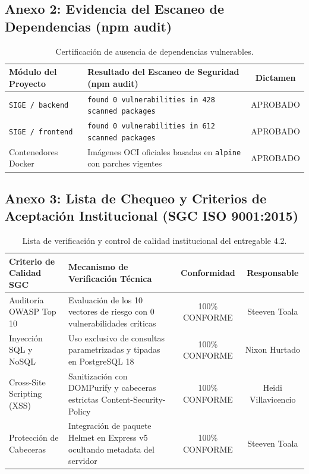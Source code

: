 \documentclass[12pt,a4paper]{article}
\begin{document}
\subsection*{Anexo 2: Evidencia del Escaneo de Dependencias (npm audit)}
\begin{table}[H]
\centering
\footnotesize
\renewcommand{\arraystretch}{1.15}
\begin{tabularx}{\textwidth}{|m{3.5cm}|X|c|}
\hline
\rowcolor{tableheader}
\textbf{Módulo del Proyecto} & \textbf{Resultado del Escaneo de Seguridad (npm audit)} & \textbf{Dictamen} \\
\hline
\texttt{SIGE / backend} & \texttt{found 0 vulnerabilities in 428 scanned packages} & APROBADO \\
\hline
\texttt{SIGE / frontend} & \texttt{found 0 vulnerabilities in 612 scanned packages} & APROBADO \\
\hline
Contenedores Docker & Imágenes OCI oficiales basadas en \texttt{alpine} con parches vigentes & APROBADO \\
\hline
\end{tabularx}
\caption{Certificación de ausencia de dependencias vulnerables.}
\end{table}

\subsection*{Anexo 3: Lista de Chequeo y Criterios de Aceptación Institucional (SGC ISO 9001:2015)}
\begin{table}[H]
\centering
\footnotesize
\renewcommand{\arraystretch}{1.15}
\begin{tabularx}{\textwidth}{|m{3.2cm}|X|c|c|}
\hline
\rowcolor{tableheader}
\textbf{Criterio de Calidad SGC} & \textbf{Mecanismo de Verificación Técnica} & \textbf{Conformidad} & \textbf{Responsable} \\
\hline
Auditoría OWASP Top 10 & Evaluación de los 10 vectores de riesgo con 0 vulnerabilidades críticas & 100\% CONFORME & Steeven Toala \\
\hline
Inyección SQL y NoSQL & Uso exclusivo de consultas parametrizadas y tipadas en PostgreSQL 18 & 100\% CONFORME & Nixon Hurtado \\
\hline
Cross-Site Scripting (XSS) & Sanitización con DOMPurify y cabeceras estrictas Content-Security-Policy & 100\% CONFORME & Heidi Villavicencio \\
\hline
Protección de Cabeceras & Integración de paquete Helmet en Express v5 ocultando metadata del servidor & 100\% CONFORME & Steeven Toala \\
\hline
\end{tabularx}
\caption{Lista de verificación y control de calidad institucional del entregable 4.2.}
\end{table}
\end{document}
